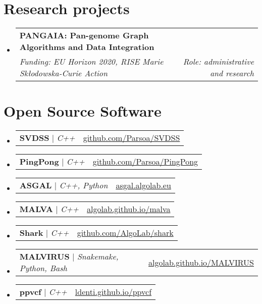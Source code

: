 \documentclass[letterpaper,11pt]{article}
\makeatletter
\newcommand{\resumeSubheading}[4]{
  \vspace{-2pt}\item
    \begin{tabular*}{0.97\textwidth}[t]{l@{\extracolsep{\fill}}r}
      \textbf{#1} & #2 \\
      \textit{\small#3} & \textit{\small #4} \\
    \end{tabular*}\vspace{-7pt}
}
\newcommand{\resumeProjectHeading}[2]{
    \item
    \begin{tabular*}{0.97\textwidth}{l@{\extracolsep{\fill}}r}
      \small#1 & #2 \\
    \end{tabular*}\vspace{-7pt}
}
\newcommand{\resumeSubHeadingListStart}{\begin{itemize}[leftmargin=0.15in, label={}]}
\newcommand{\resumeSubHeadingListEnd}{\end{itemize}}
\makeatother
\begin{document}
\section{Research projects}
  \resumeSubHeadingListStart
    \resumeSubheading
      {PANGAIA: Pan-genome Graph Algorithms and Data Integration}{}
      {Funding: EU Horizon 2020, RISE Marie Skłodowska-Curie Action}{Role: administrative and research}
  \resumeSubHeadingListEnd


\section{Open Source Software}
    \resumeSubHeadingListStart
      \resumeProjectHeading {\textbf{SVDSS} $|$ \emph{C++}}{\href{https://github.com/Parsoa/SVDSS}{github.com/Parsoa/SVDSS}}
      \resumeProjectHeading {\textbf{PingPong} $|$ \emph{C++}}{\href{https://github.com/Parsoa/PingPong}{github.com/Parsoa/PingPong}}
      \resumeProjectHeading {\textbf{ASGAL} $|$ \emph{C++, Python}}{\href{https://asgal.algolab.eu/}{asgal.algolab.eu}}
      \resumeProjectHeading {\textbf{MALVA} $|$ \emph{C++}}{\href{https://algolab.github.io/malva/}{algolab.github.io/malva}}
      \resumeProjectHeading {\textbf{Shark} $|$ \emph{C++}}{\href{https://github.com/AlgoLab/shark}{github.com/AlgoLab/shark}}
      \resumeProjectHeading {\textbf{MALVIRUS} $|$ \emph{Snakemake, Python, Bash}}{\href{https://algolab.github.io/MALVIRUS/}{algolab.github.io/MALVIRUS}}
      \resumeProjectHeading {\textbf{ppvcf} $|$ \emph{C++}}{\href{https://ldenti.github.io/ppvcf/}{ldenti.github.io/ppvcf}}
    \resumeSubHeadingListEnd
\end{document}
